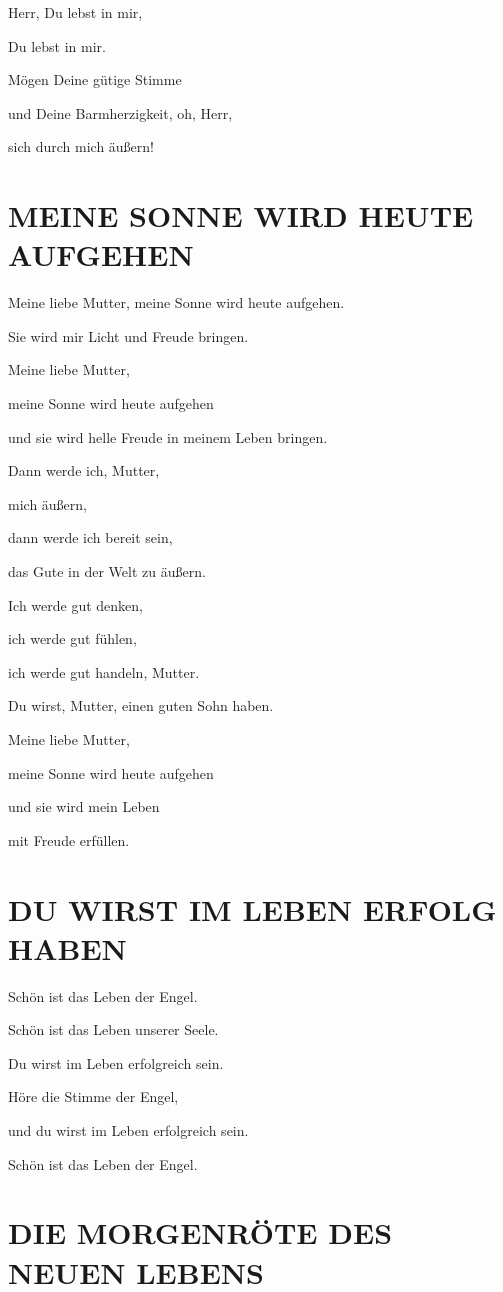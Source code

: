 \documentclass[11pt,a5paper,twoside]{article}
\begin{document}
Herr, Du lebst in mir,

Du lebst in mir.

Mögen Deine gütige Stimme

und Deine Barmherzigkeit, oh, Herr, 

sich durch mich äußern!

\section[Meine Sonne wird heute aufgehen]{MEINE SONNE WIRD HEUTE AUFGEHEN}

Meine liebe Mutter, meine Sonne wird heute aufgehen. 

Sie wird mir Licht und Freude bringen.

Meine liebe Mutter,

meine Sonne wird heute aufgehen

und sie wird helle Freude in meinem Leben bringen.

Dann werde ich, Mutter,

mich äußern,

dann werde ich bereit sein,

das Gute in der Welt zu äußern. 

Ich werde gut denken,

ich werde gut fühlen,

ich werde gut handeln, Mutter.

Du wirst, Mutter, einen guten Sohn haben.

Meine liebe Mutter,

meine Sonne wird heute aufgehen 

und sie wird mein Leben 

mit Freude erfüllen. 


\section[Du wirst im Leben Erfolg haben]{DU WIRST IM LEBEN ERFOLG HABEN}

Schön ist das Leben der Engel. 

Schön ist das Leben unserer Seele. 

Du wirst im Leben erfolgreich sein.

Höre die Stimme der Engel, 

und du wirst im Leben erfolgreich sein. 

Schön ist das Leben der Engel.

\section[Die Morgenröte des neuen Lebens]{DIE MORGENRÖTE DES NEUEN LEBENS}
\end{document}
